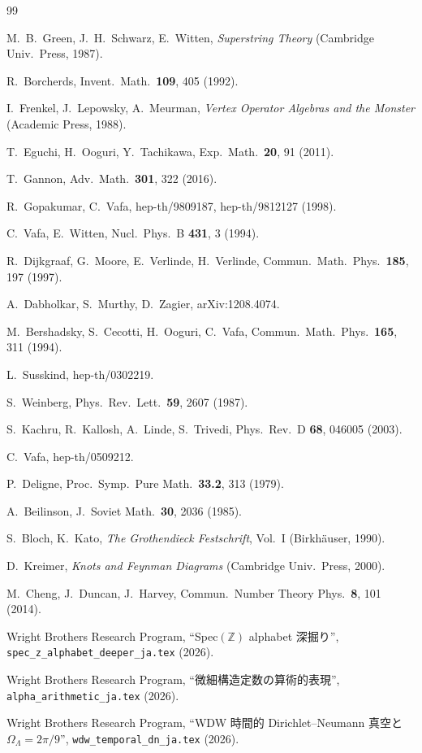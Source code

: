 \documentclass[11pt,a4paper]{article}
\begin{document}
\begin{thebibliography}{99}

M.~B.~Green, J.~H.~Schwarz, E.~Witten, \textit{Superstring Theory}
(Cambridge Univ.\ Press, 1987).

R.~Borcherds, Invent.\ Math.\ \textbf{109}, 405 (1992).

I.~Frenkel, J.~Lepowsky, A.~Meurman, \textit{Vertex Operator
Algebras and the Monster} (Academic Press, 1988).

T.~Eguchi, H.~Ooguri, Y.~Tachikawa,
Exp.\ Math.\ \textbf{20}, 91 (2011).

T.~Gannon, Adv.\ Math.\ \textbf{301}, 322 (2016).

R.~Gopakumar, C.~Vafa, hep-th/9809187, hep-th/9812127 (1998).

C.~Vafa, E.~Witten, Nucl.\ Phys.\ B \textbf{431}, 3 (1994).

R.~Dijkgraaf, G.~Moore, E.~Verlinde, H.~Verlinde,
Commun.\ Math.\ Phys.\ \textbf{185}, 197 (1997).

A.~Dabholkar, S.~Murthy, D.~Zagier, arXiv:1208.4074.

M.~Bershadsky, S.~Cecotti, H.~Ooguri, C.~Vafa,
Commun.\ Math.\ Phys.\ \textbf{165}, 311 (1994).

L.~Susskind, hep-th/0302219.

S.~Weinberg, Phys.\ Rev.\ Lett.\ \textbf{59}, 2607 (1987).

S.~Kachru, R.~Kallosh, A.~Linde, S.~Trivedi,
Phys.\ Rev.\ D \textbf{68}, 046005 (2003).

C.~Vafa, hep-th/0509212.

P.~Deligne, Proc.\ Symp.\ Pure Math.\ \textbf{33.2}, 313 (1979).

A.~Beilinson, J.\ Soviet Math.\ \textbf{30}, 2036 (1985).

S.~Bloch, K.~Kato, \textit{The Grothendieck Festschrift}, Vol.\ I
(Birkhäuser, 1990).

D.~Kreimer, \textit{Knots and Feynman Diagrams}
(Cambridge Univ.\ Press, 2000).

M.~Cheng, J.~Duncan, J.~Harvey,
Commun.\ Number Theory Phys.\ \textbf{8}, 101 (2014).

Wright Brothers Research Program, ``Spec$(\mathbb{Z})$ alphabet 深掘り'',
\texttt{spec\_z\_alphabet\_deeper\_ja.tex} (2026).

Wright Brothers Research Program, ``微細構造定数の算術的表現'',
\texttt{alpha\_arithmetic\_ja.tex} (2026).

Wright Brothers Research Program, ``WDW 時間的 Dirichlet--Neumann
真空と $\Omega_\Lambda = 2\pi/9$'',
\texttt{wdw\_temporal\_dn\_ja.tex} (2026).

\end{thebibliography}
\end{document}
